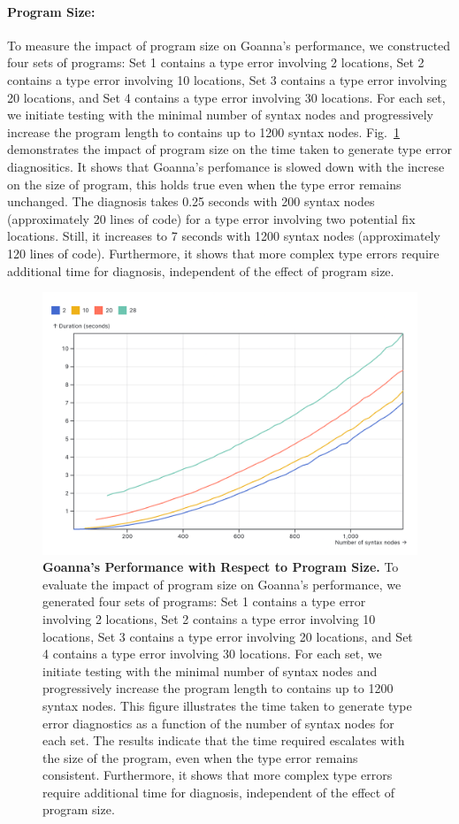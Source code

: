 \documentclass[pdflatex,lineno,sn-nature,Numbered]{sn-jnl}%
\begin{document}
\paragraph{Program Size:}
To measure the impact of program size on Goanna's performance, we constructed four sets of programs: Set 1 contains a type error involving 2 locations, Set 2 contains a type error involving 10 locations, Set 3 contains a type error involving 20 locations, and Set 4 contains a type error involving 30 locations. For each set, we initiate testing with the minimal number of syntax nodes and progressively increase the program length to contains up to 1200 syntax nodes. Fig.~\ref{fig:node-size} demonstrates the impact of program size on the time taken to generate type error diagnositics. It shows that Goanna's perfomance is slowed down with the increse on the size of program, this holds true even when the type error remains unchanged. The diagnosis takes 0.25 seconds with 200 syntax nodes (approximately 20 lines of code) for a type error involving two potential fix locations. Still, it increases to 7 seconds with 1200 syntax nodes (approximately 120 lines of code). Furthermore, it shows that more complex type errors require additional time for diagnosis, independent of the effect of program size.

\begin{figure}[ht]
    \centering
    \includegraphics[width=0.8\linewidth]{images/program-size.png}
    \caption{{\bf Goanna's Performance with Respect to Program Size.} To evaluate the impact of program size on Goanna's performance, we generated four sets of programs: Set 1 contains a type error involving 2 locations, Set 2 contains a type error involving 10 locations, Set 3 contains a type error involving 20 locations, and Set 4 contains a type error involving 30 locations. For each set, we initiate testing with the minimal number of syntax nodes and progressively increase the program length to contains up to 1200 syntax nodes. This figure illustrates the time taken to generate type error diagnostics as a function of the number of syntax nodes for each set. The results indicate that the time required escalates with the size of the program, even when the type error remains consistent. Furthermore, it shows that more complex type errors require additional time for diagnosis, independent of the effect of program size.}
    \label{fig:node-size}
\end{figure}
\end{document}
